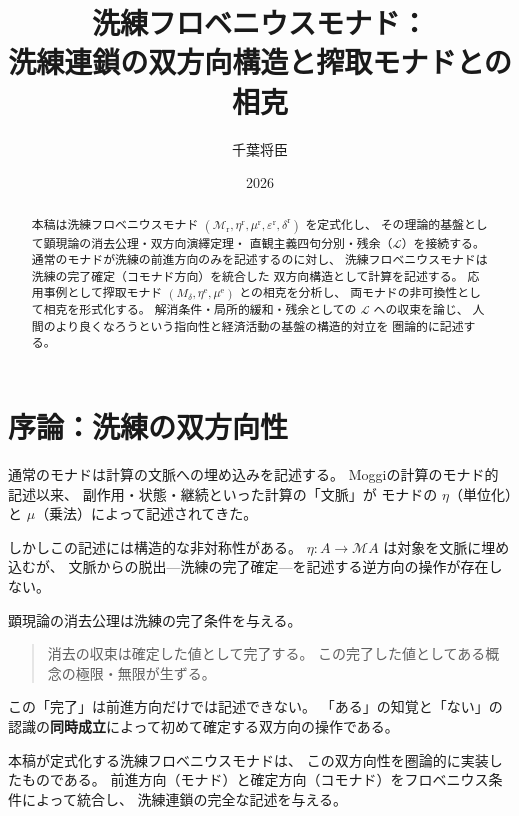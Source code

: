 \documentclass[11pt,a4paper]{article}
\theoremstyle{definition}
\newcommand{\Lhagma}{\mathcal{L}}
\newcommand{\Mr}{\mathcal{M}_{\mathrm{r}}}
\newcommand{\Md}{M_{\delta}}
\newcommand{\etar}{\eta^{\mathrm{r}}}
\newcommand{\mur}{\mu^{\mathrm{r}}}
\newcommand{\epsr}{\varepsilon^{\mathrm{r}}}
\newcommand{\deltar}{\delta^{\mathrm{r}}}
\newcommand{\etae}{\eta^{\mathrm{e}}}
\newcommand{\mue}{\mu^{\mathrm{e}}}
\begin{document}
\title{洗練フロベニウスモナド：\\
洗練連鎖の双方向構造と搾取モナドとの相克}
\author{千葉将臣}
\date{2026}

\maketitle

\begin{abstract}
本稿は洗練フロベニウスモナド $(\Mr, \etar, \mur, \epsr, \deltar)$ を定式化し、
その理論的基盤として顕現論の消去公理・双方向演繹定理・
直観主義四句分別・残余（$\Lhagma$）を接続する。
通常のモナドが洗練の前進方向のみを記述するのに対し、
洗練フロベニウスモナドは洗練の完了確定（コモナド方向）を統合した
双方向構造として計算を記述する。
応用事例として搾取モナド $(\Md, \etae, \mue)$ との相克を分析し、
両モナドの非可換性として相克を形式化する。
解消条件・局所的緩和・残余としての $\Lhagma$ への収束を論じ、
人間のより良くなろうという指向性と経済活動の基盤の構造的対立を
圏論的に記述する。
\end{abstract}

\tableofcontents
\newpage

\section{序論：洗練の双方向性}

通常のモナドは計算の文脈への埋め込みを記述する。
Moggiの計算のモナド的記述\cite{Moggi1991}以来、
副作用・状態・継続といった計算の「文脈」が
モナドの $\eta$（単位化）と $\mu$（乗法）によって記述されてきた。

しかしこの記述には構造的な非対称性がある。
$\eta : A \to \mathcal{M}A$ は対象を文脈に埋め込むが、
文脈からの脱出---洗練の完了確定---を記述する逆方向の操作が存在しない。

顕現論の消去公理\cite{Chiba2026_chikaku}は洗練の完了条件を与える。

\begin{quote}
消去の収束は確定した値として完了する。
この完了した値としてある概念の極限・無限が生ずる。
\end{quote}

この「完了」は前進方向だけでは記述できない。
「ある」の知覚と「ない」の認識の\textbf{同時成立}によって初めて確定する双方向の操作である。

本稿が定式化する洗練フロベニウスモナドは、
この双方向性を圏論的に実装したものである。
前進方向（モナド）と確定方向（コモナド）をフロベニウス条件によって統合し、
洗練連鎖の完全な記述を与える。
\end{document}
